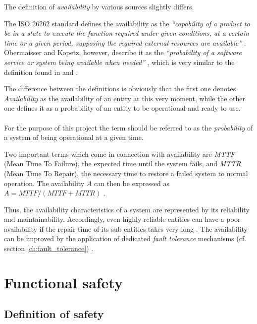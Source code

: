 \label{sec:availability}
The definition of \emph{availability} by various sources slightly differs.

The ISO 26262 standard defines the availability as the \emph{``capability of a product to be in a state to execute the function required under given conditions, at a certain time or a given period, supposing the required external resources are available''} \cite{iso26262:1}. Obermaisser and Kopetz, however, describe it as the \emph{``probability of a software service or system being available when needed''} \cite[p.116]{genesys}, which is very similar to the definition found in \cite{lessner} and \cite{nelson}.

The difference between the definitions is obviously that the first one denotes \emph{Availability} as the availability of an entity at this very moment, while the other one defines it as a probability of an entity to be operational and ready to use.
\\
\\
For the purpose of this project the term should be referred to as the \emph{probability} of a system of being operational at a given time.

Two important terms which come in connection with availability are \emph{MTTF} (Mean Time To Failure), the expected time until the system fails, and \emph{MTTR} (Mean Time To Repair), the necessary time to restore a failed system to normal operation. The availability $A$ can then be expressed as $A = MTTF/(MTTF + MTTR)$ \cite{nelson}. 

Thus, the availability characteristics of a system are represented by its reliability and maintainability. Accordingly, even highly reliable entities can have a poor availability if the repair time of its sub entities takes very long \cite{lessner}. The availability can be improved by the application of dedicated \emph{fault tolerance} mechanisms (cf. section \ref{ch:fault_tolerance}) \cite{nelson}.















\section{Functional safety}
\label{ch:functional_safety}


\subsection{Definition of safety}

